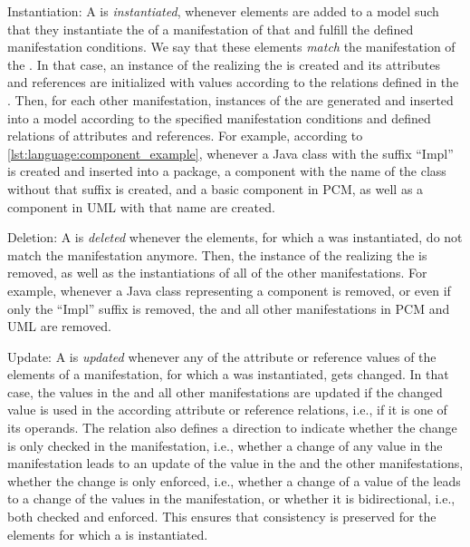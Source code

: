 \begin{properdescription}
\item[Instantiation:] 
A \commonality is \emph{instantiated}, whenever elements are added to a model such that they instantiate the \metaclasses of a manifestation of that \commonality and fulfill the defined manifestation conditions.
We say that these elements \emph{match} the manifestation of the \commonality.
In that case, an instance of the \metaclass realizing the \commonality is created and its attributes and references are initialized with values according to the relations defined in the \commonality.
Then, for each other manifestation, instances of the \metaclasses are generated and inserted into a model according to the specified manifestation conditions and defined relations of attributes and references.
For example, according to \autoref{lst:language:component_example}, whenever a Java class with the suffix \enquote{Impl} is created and inserted into a package, a component \commonality with the name of the class without that suffix is created, and a basic component in \gls{PCM}, as well as a component in \gls{UML} with that name are created.

\item[Deletion:] 
A \commonality is \emph{deleted} whenever the elements, for which a \commonality was instantiated, do not match the manifestation anymore.
Then, the instance of the \metaclass realizing the \commonality is removed, as well as the instantiations of all \metaclasses of the other manifestations.
For example, whenever a Java class representing a component is removed, or even if only the \enquote{Impl} suffix is removed, the \commonality and all other manifestations in \gls{PCM} and \gls{UML} are removed.

\item[Update:] 
A \commonality is \emph{updated} whenever any of the attribute or reference values of the elements of a manifestation, for which a \commonality was instantiated, gets changed.
In that case, the values in the \commonality and all other manifestations are updated if the changed value is used in the according attribute or reference relations, i.e., if it is one of its operands.
The relation also defines a direction to indicate whether the change is only checked in the manifestation, i.e., whether a change of any value in the manifestation leads to an update of the value in the \commonality and the other manifestations, whether the change is only enforced, i.e., whether a change of a value of the \commonality leads to a change of the values in the manifestation, or whether it is bidirectional, i.e., both checked and enforced.
This ensures that consistency is preserved for the elements for which a \commonality is instantiated.
\end{properdescription}


